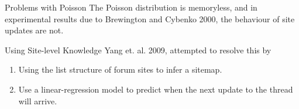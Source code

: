 \documentclass[compress]{beamer}
\begin{document}
\begin{frame}{Problems with Poisson}
	The Poisson distribution is memoryless, and in experimental results due to Brewington and Cybenko 2000, the behaviour of site updates are not. 
\end{frame}

\begin{frame}{Using Site-level Knowledge}
Yang et. al. 2009, attempted to resolve this by
	\begin{enumerate}
		\item Using the list structure of forum sites to infer a sitemap.
		\item Use a linear-regression model to predict when the next update to the thread will arrive. %
	\end{enumerate}
\end{frame}






\end{document}
